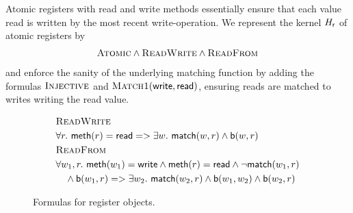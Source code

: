\begin{example}

  Atomic registers with {\sf read} and {\sf write} methods essentially ensure
  that each value read is written by the most recent {\sc write}-operation.
  We represent the kernel $H_{\sf r}$ of atomic registers by
  \begin{align*}
    \textsc{Atomic} \land \textsc{ReadWrite} \land \textsc{ReadFrom}
  \end{align*}
  and enforce the sanity of the underlying matching function by adding the
  formulas $\textsc{Injective}$ and $\textsc{Match1}({\sf write},{\sf read})$,
  ensuring reads are matched to writes writing the read value.

\end{example}

\begin{figure}
  \footnotesize
  \begin{align*}
    & \textsc{ReadWrite} \\
    & \forall r.\ {\sf meth}(r) = {\sf read} => \exists w.\ {\sf match}(w,r) \land {\sf b}(w,r)
    \\
    & \textsc{ReadFrom} \\
    & \forall w_1, r.\ {\sf meth}(w_1) = {\sf write} \land {\sf meth}(r) = {\sf read} \land \neg {\sf match}(w_1,r) \\
    & \quad \land {\sf b}(w_1,r) => \exists w_2.\ {\sf match}(w_2,r) \land {\sf b}(w_1,w_2) \land {\sf b}(w_2,r)
  \end{align*}
  \caption{Formulas for register objects.}
  \label{fig:formulas:register}
\end{figure}

